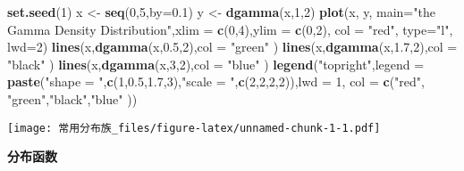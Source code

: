 \documentclass[]{article}
\newenvironment{Shaded}{\begin{snugshade}}{\end{snugshade}}
\newcommand{\DataTypeTok}[1]{\textcolor[rgb]{0.13,0.29,0.53}{#1}}
\newcommand{\DecValTok}[1]{\textcolor[rgb]{0.00,0.00,0.81}{#1}}
\newcommand{\FloatTok}[1]{\textcolor[rgb]{0.00,0.00,0.81}{#1}}
\newcommand{\KeywordTok}[1]{\textcolor[rgb]{0.13,0.29,0.53}{\textbf{#1}}}
\newcommand{\NormalTok}[1]{#1}
\newcommand{\StringTok}[1]{\textcolor[rgb]{0.31,0.60,0.02}{#1}}
\begin{document}
\begin{Shaded}
\begin{Highlighting}[]
\KeywordTok{set.seed}\NormalTok{(}\DecValTok{1}\NormalTok{)}
\NormalTok{x <-}\StringTok{ }\KeywordTok{seq}\NormalTok{(}\DecValTok{0}\NormalTok{,}\DecValTok{5}\NormalTok{,}\DataTypeTok{by=}\FloatTok{0.1}\NormalTok{)}
\NormalTok{y <-}\StringTok{ }\KeywordTok{dgamma}\NormalTok{(x,}\DecValTok{1}\NormalTok{,}\DecValTok{2}\NormalTok{)}
\KeywordTok{plot}\NormalTok{(x, y, }\DataTypeTok{main=}\StringTok{"the Gamma Density Distribution"}\NormalTok{,}\DataTypeTok{xlim =} \KeywordTok{c}\NormalTok{(}\DecValTok{0}\NormalTok{,}\DecValTok{4}\NormalTok{),}\DataTypeTok{ylim =} \KeywordTok{c}\NormalTok{(}\DecValTok{0}\NormalTok{,}\DecValTok{2}\NormalTok{), }\DataTypeTok{col =} \StringTok{"red"}\NormalTok{, }\DataTypeTok{type=}\StringTok{"l"}\NormalTok{, }\DataTypeTok{lwd=}\DecValTok{2}\NormalTok{)}
\KeywordTok{lines}\NormalTok{(x,}\KeywordTok{dgamma}\NormalTok{(x,}\FloatTok{0.5}\NormalTok{,}\DecValTok{2}\NormalTok{),}\DataTypeTok{col =} \StringTok{"green"}\NormalTok{ )}
\KeywordTok{lines}\NormalTok{(x,}\KeywordTok{dgamma}\NormalTok{(x,}\FloatTok{1.7}\NormalTok{,}\DecValTok{2}\NormalTok{),}\DataTypeTok{col =} \StringTok{"black"}\NormalTok{ )}
\KeywordTok{lines}\NormalTok{(x,}\KeywordTok{dgamma}\NormalTok{(x,}\DecValTok{3}\NormalTok{,}\DecValTok{2}\NormalTok{),}\DataTypeTok{col =} \StringTok{"blue"}\NormalTok{ )}
\KeywordTok{legend}\NormalTok{(}\StringTok{"topright"}\NormalTok{,}\DataTypeTok{legend =} \KeywordTok{paste}\NormalTok{(}\StringTok{"shape = "}\NormalTok{,}\KeywordTok{c}\NormalTok{(}\DecValTok{1}\NormalTok{,}\FloatTok{0.5}\NormalTok{,}\FloatTok{1.7}\NormalTok{,}\DecValTok{3}\NormalTok{),}\StringTok{"scale = "}\NormalTok{,}\KeywordTok{c}\NormalTok{(}\DecValTok{2}\NormalTok{,}\DecValTok{2}\NormalTok{,}\DecValTok{2}\NormalTok{,}\DecValTok{2}\NormalTok{)),}\DataTypeTok{lwd =} \DecValTok{1}\NormalTok{, }\DataTypeTok{col =} \KeywordTok{c}\NormalTok{(}\StringTok{"red"}\NormalTok{, }\StringTok{"green"}\NormalTok{,}\StringTok{"black"}\NormalTok{,}\StringTok{"blue"}\NormalTok{ ))}
\end{Highlighting}
\end{Shaded}

\texttt{[image: 常用分布族\_files/figure-latex/unnamed-chunk-1-1.pdf]}

\textbf{分布函数}
\end{document}

